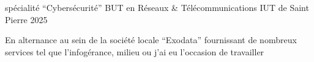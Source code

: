 
\begin{cventries}

  \cventry
    {spécialité ``Cybersécurité''}
    {BUT en Réseaux \& Télécommunications}
    {IUT de Saint Pierre}
    {2025}
    {
      \begin{cvitems}
        \item {En alternance au sein de la société locale ``Exodata'' fournissant de nombreux services tel que l'infogérance, milieu ou j'ai eu l'occasion de travailler}
      \end{cvitems}
    }

\end{cventries}
